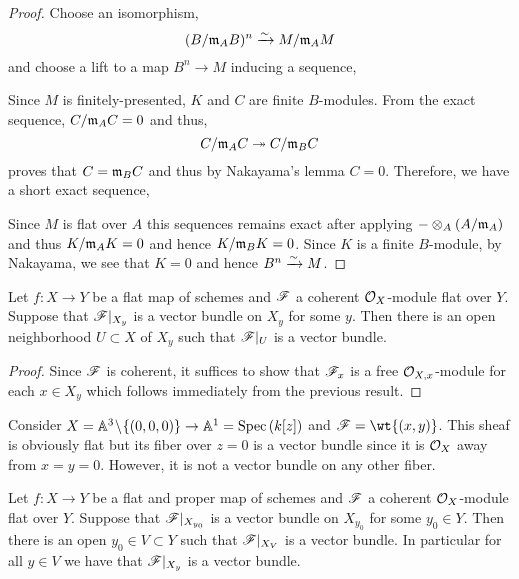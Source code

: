 \documentclass[12pt]{article}
\begin{document}
\begin{proof}
Choose an isomorphism,
\[ (B / \mathfrak{m}_A B)^n \xrightarrow{\sim} M / \mathfrak{m}_A M \]
and choose a lift to a map $B^n \to M$ inducing a sequence,
\begin{center}
\end{center}
Since $M$ is finitely-presented, $K$ and $C$ are finite $B$-modules. From the exact sequence, $C / \mathfrak{m}_A C = 0$ and thus,
\[ C / \mathfrak{m}_A C \twoheadrightarrow C / \mathfrak{m}_B C \]
proves that $C = \mathfrak{m}_B C$ and thus by Nakayama's lemma $C = 0$. Therefore, we have a short exact sequence,
\begin{center}
\end{center}
Since $M$ is flat over $A$ this sequences remains exact after applying $- \otimes_A (A/\mathfrak{m}_A)$ and thus $K / \mathfrak{m}_A K = 0$ and hence $K / \mathfrak{m}_B K = 0$. Since $K$ is a finite $B$-module, by Nakayama, we see that $K = 0$ and hence $B^n \xrightarrow{\sim} M$. 
\end{proof}

\begin{cor}
Let $f : X \to Y$ be a flat map of schemes and $\mathscr{F}$ a coherent $\mathcal{O}_{X}$-module flat over $Y$. Suppose that $\mathscr{F}|_{X_y}$ is a vector bundle on $X_y$ for some $y$. Then there is an open neighborhood $U \subset X$ of $X_y$ such that $\mathscr{F}|_U$ is a vector bundle.
\end{cor}

\begin{proof}
Since $\mathscr{F}$ is coherent, it suffices to show that $\mathscr{F}_x$ is a free $\mathcal{O}_{X, x}$-module for each $x \in X_y$ which follows immediately from the previous result.
\end{proof}

\begin{example}
Consider $X = \mathbb{A}^3 \! \setminus \! \{(0,0,0)\} \to \mathbb{A}^1 = \mathrm{Spec}\left( k[z] \right)$ and $\F = \wt{(x,y)}$. This sheaf is obviously flat but its fiber over $z = 0$ is a vector bundle since it is $\mathcal{O}_{X}$ away from $x = y = 0$. However, it is not a vector bundle on any other fiber. 
\end{example}


\begin{cor}
Let $f : X \to Y$ be a flat and proper map of schemes and $\mathscr{F}$ a coherent $\mathcal{O}_{X}$-module flat over $Y$. Suppose that $\mathscr{F}|_{X_{y_0}}$ is a vector bundle on $X_{y_0}$ for some $y_0 \in Y$. Then there is an open $y_0 \in V \subset Y$ such that $\mathscr{F}|_{X_V}$ is a vector bundle. In particular for all $y \in V$ we have that $\mathscr{F}|_{X_{y}}$ is a vector bundle.
\end{cor}
\end{document}

